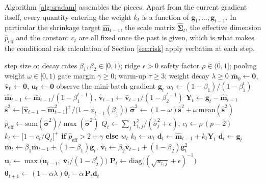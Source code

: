 \documentclass[a4paper,fleqn]{cas-sc}
\theoremstyle{plain}
\theoremstyle{definition}
\theoremstyle{remark}
\newcommand{\peff}{p_{\mathrm{eff}}}
\newcommand{\diag}{\mathrm{diag}}
\begin{document}
Algorithm \ref{alg:sradam} assembles the pieces. Apart from the current gradient itself, every quantity entering the weight $k_t$ is a function of $\bm g_1,\dots,\bm g_{t-1}$. In particular the shrinkage target $\hat{\bm m}_{t-1}$, the scale matrix $\widehat{\bm\Sigma}_t$, the effective dimension $\hat\peff$ and the constant $c_t$ are all fixed once the past is given, which is what makes the conditional risk calculation of Section \ref{sec:risk} apply verbatim at each step.

\begin{algorithm}[t]
\caption{SR-Adam, applied blockwise}
\label{alg:sradam}
\begin{algorithmic}[1]
\Require step size $\alpha$; decay rates $\beta_1,\beta_2\in[0,1)$; ridge $\epsilon>0$
\Statex \hspace{1.2em} safety factor $\rho\in(0,1]$; pooling weight $\omega\in[0,1)$
\Statex \hspace{1.2em} gate margin $\gamma\ge0$; warm-up $\tau\ge3$; weight decay $\lambda\ge0$
\State $\bar{\bm m}_0\gets\bm 0$, $\bar{\bm v}_0\gets\bm 0$, $\bm u_0\gets\bm 0$
  \State observe the mini-batch gradient $\bm g_t$
  \State $w_t\gets(1-\beta_1)/(1-\beta_1^{t})$ 
    \State $\hat{\bm m}_{t-1}\gets\bar{\bm m}_{t-1}/(1-\beta_1^{t-1})$, \quad $\hat{\bm v}_{t-1}\gets\bar{\bm v}_{t-1}/(1-\beta_2^{t-1})$
    \State $\bm Y_t\gets\bm g_t-\hat{\bm m}_{t-1}$
      \State $\hat{\bm s}^2\gets\bigl[\hat{\bm v}_{t-1}-\hat{\bm m}_{t-1}^{2}\bigr]^{+}\big/\bigl(1-\phi_{t-1}(\beta_1)\bigr)$ 
      \State $\hat{\bm\sigma}^2\gets(1-\omega)\hat{\bm s}^2+\omega\,\mathrm{mean}(\hat{\bm s}^2)$ 
      \State $\hat\peff\gets\mathrm{sum}(\hat{\bm\sigma}^2)\big/\max(\hat{\bm\sigma}^2)$
      \State $Q_t\gets\sum_{j}Y^2_{t,j}/(\hat\sigma^2_{j}+\epsilon)$, \quad $c_t\gets\rho\,(p-2)$
      \State $k_t\gets\bigl[1-c_t/Q_t\bigr]^{+}$ \textbf{if} $\hat\peff>2+\gamma$ \textbf{else} $w_t$
    \Else
      \State $k_t\gets w_t$
    \EndIf
    \State $\bm d_t\gets\hat{\bm m}_{t-1}+k_t\bm Y_t$
  \Else
    \State $\bm d_t\gets\bm g_t$
  \EndIf
  \State $\bar{\bm m}_t\gets\beta_1\bar{\bm m}_{t-1}+(1-\beta_1)\bm g_t$, \quad $\bar{\bm v}_t\gets\beta_2\bar{\bm v}_{t-1}+(1-\beta_2)\bm g_t^{2}$
  \State $\bm u_t\gets\max\bigl(\bm u_{t-1},\;\bar{\bm v}_t/(1-\beta_2^{t})\bigr)$ 
  \State $\bm P_t\gets\diag\bigl((\sqrt{u_{t,j}}+\epsilon)^{-1}\bigr)$
  \State $\bm\theta_{t+1}\gets(1-\alpha\lambda)\bm\theta_t-\alpha\,\bm P_t\bm d_t$
\EndFor
\end{algorithmic}
\end{algorithm}
\end{document}
